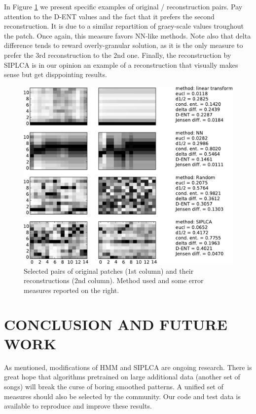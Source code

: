 \documentclass{article}
\begin{document}
In Figure \ref{fig:origrecon} we present specific examples of original
/ reconstruction pairs. Pay attention to the D-ENT values and the fact
that it prefers the second reconstruction.  It is due to a similar
repartition of graey-scale values troughout the patch. Once again,
this measure favors NN-like methods. Note also that delta difference
tends to reward overly-granular solution, as it is the only measure to
prefer the $3$rd reconstruction to the $2$nd one. Finally, the
reconstruction by SIPLCA is in our opinion an example of a
reconstruction that visually makes sense but get disppointing results.

\begin{figure}[t]
\begin{center}
\includegraphics[width=.9\columnwidth]{original_recons}
\end{center}
\caption{Selected pairs of original patches ($1$st column)
and their reconstructions ($2$nd column). 
Method used and some error measures
reported on the right.
\label{fig:origrecon}}
\end{figure}

\section{CONCLUSION AND FUTURE WORK}
\label{sec:conclusion}
As mentioned, modifications of HMM and SIPLCA are ongoing
research. There is great hope that algorithms pretrained
on large additional data (another set of songs) will break
the curse of boring smoothed patterns.
A unified set of measures should also be selected
by the community. Our code and test data is available to 
reproduce and improve these results.
\end{document}
